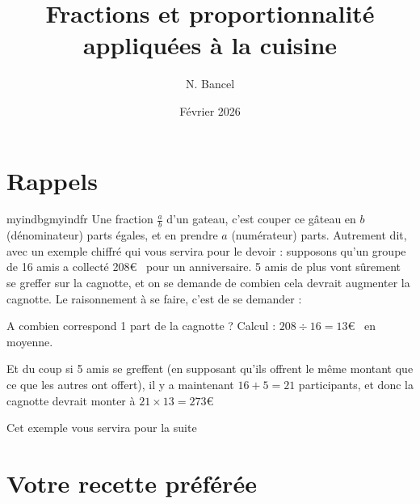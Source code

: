 \documentclass{exam}
\title{Fractions et proportionnalité appliquées à la cuisine}
\author{N. Bancel}
\date{Février 2026}
\begin{document}
{\let\newpage\relax\maketitle}

\section{Rappels}

\begin{Indication}{myindbg}{myindfr}
  Une fraction $\frac{a}{b}$ d'un gateau, c'est couper ce gâteau en $b$ (dénominateur) parts égales, et en prendre $a$ (numérateur) parts. Autrement dit, avec un exemple chiffré qui vous servira pour le devoir : supposons qu'un groupe de 16 amis a collecté 208\euro ~ pour un anniversaire. 5 amis de plus vont sûrement se greffer sur la cagnotte, et on se demande de combien cela devrait augmenter la cagnotte.
  Le raisonnement à se faire, c'est de se demander : 
  \begin{compactitem}
    \item A combien correspond 1 part de la cagnotte ? Calcul : $208 \div 16 = 13$\euro ~ en moyenne.
    \item Et du coup si 5 amis se greffent (en supposant qu'ils offrent le même montant que ce que les autres ont offert), il y a maintenant $16 + 5 = 21$ participants, et donc la cagnotte devrait monter à $21 \times 13 = 273$\euro
  \end{compactitem}

  Cet exemple vous servira pour la suite
\end{Indication}

\section{Votre recette préférée}
\end{document}
